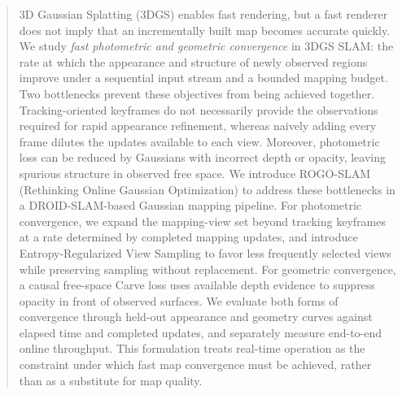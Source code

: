 \begin{abstract}
3D Gaussian Splatting (3DGS) enables fast rendering, but a fast renderer does
not imply that an incrementally built map becomes accurate quickly. We study
\emph{fast photometric and geometric convergence} in 3DGS SLAM: the rate at
which the appearance and structure of newly observed regions improve under a
sequential input stream and a bounded mapping budget. Two bottlenecks prevent
these objectives from being achieved together. Tracking-oriented keyframes do
not necessarily provide the observations required for rapid appearance
refinement, whereas naively adding every frame dilutes the updates available
to each view. Moreover, photometric loss can be reduced by Gaussians with
incorrect depth or opacity, leaving spurious structure in observed free space.
We introduce ROGO-SLAM (Rethinking Online Gaussian Optimization) to address
these bottlenecks in a DROID-SLAM-based Gaussian mapping pipeline.
For photometric convergence, we expand the mapping-view set beyond tracking
keyframes at a rate determined by completed mapping updates, and introduce
Entropy-Regularized View Sampling to favor less frequently selected views
while preserving sampling without replacement. For
geometric convergence, a causal free-space Carve loss uses available depth
evidence to suppress opacity in front of observed surfaces. We evaluate both
forms of convergence through held-out appearance and geometry curves against
elapsed time and completed updates, and separately measure end-to-end online
throughput. This formulation treats real-time operation as the constraint
under which fast map convergence must be achieved, rather than as a substitute
for map quality.
\end{abstract}
